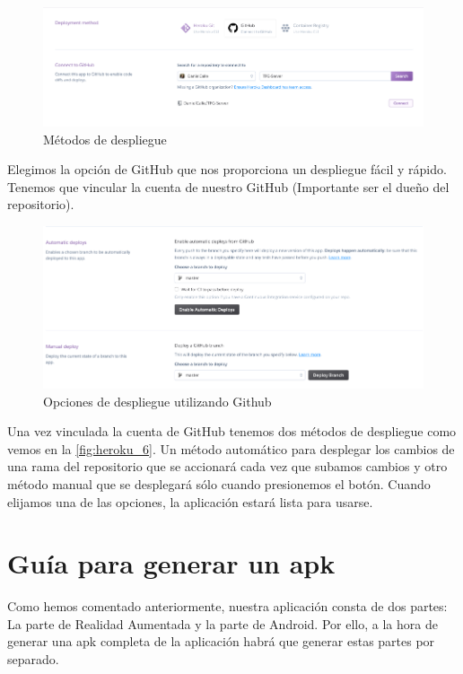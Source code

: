 \begin{figure}[H]
    \centering
    \includegraphics[width=6in]{figures/appendix-A/heroku_5.png}
    \caption{Métodos de despliegue}
    \label{fig:heroku_5}
\end{figure}
Elegimos la opción de GitHub que nos proporciona un despliegue fácil y rápido.
Tenemos que vincular la cuenta de nuestro GitHub (Importante ser el dueño del
 repositorio).
\begin{figure}[H]
    \centering
    \includegraphics[width=6in]{figures/appendix-A/heroku_6.png}
    \caption{Opciones de despliegue utilizando Github}
    \label{fig:heroku_6}
\end{figure}

Una vez vinculada la cuenta de GitHub tenemos dos métodos de despliegue como
 vemos en la \autoref{fig:heroku_6}. Un método automático para desplegar los
 cambios de una rama del repositorio que se accionará cada vez que subamos
 cambios y otro método manual que se desplegará sólo cuando presionemos
 el botón. 
Cuando elijamos una de las opciones, la aplicación estará lista para usarse.

\section{Guía para generar un apk}
\label{app:apk}
Como hemos comentado anteriormente, nuestra aplicación consta de dos partes: La parte de Realidad Aumentada y 
la parte de Android. Por ello, a la hora de generar una apk completa de la aplicación habrá que generar estas partes 
por separado.

